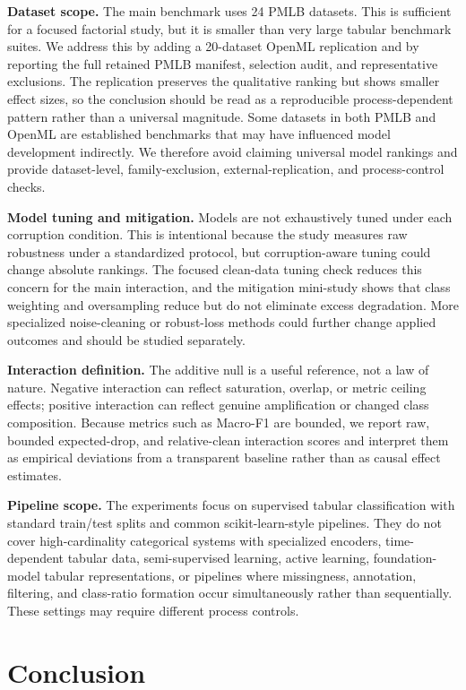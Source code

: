 \documentclass[preprint,12pt,number]{elsarticle}
\begin{document}
\textbf{Dataset scope.} The main benchmark uses 24 PMLB datasets. This is sufficient for a focused factorial study, but it is smaller than very large tabular benchmark suites. We address this by adding a 20-dataset OpenML replication and by reporting the full retained PMLB manifest, selection audit, and representative exclusions. The replication preserves the qualitative ranking but shows smaller effect sizes, so the conclusion should be read as a reproducible process-dependent pattern rather than a universal magnitude. Some datasets in both PMLB and OpenML are established benchmarks that may have influenced model development indirectly. We therefore avoid claiming universal model rankings and provide dataset-level, family-exclusion, external-replication, and process-control checks.

\textbf{Model tuning and mitigation.} Models are not exhaustively tuned under each corruption condition. This is intentional because the study measures raw robustness under a standardized protocol, but corruption-aware tuning could change absolute rankings. The focused clean-data tuning check reduces this concern for the main interaction, and the mitigation mini-study shows that class weighting and oversampling reduce but do not eliminate excess degradation. More specialized noise-cleaning or robust-loss methods could further change applied outcomes and should be studied separately.

\textbf{Interaction definition.} The additive null is a useful reference, not a law of nature. Negative interaction can reflect saturation, overlap, or metric ceiling effects; positive interaction can reflect genuine amplification or changed class composition. Because metrics such as Macro-F1 are bounded, we report raw, bounded expected-drop, and relative-clean interaction scores and interpret them as empirical deviations from a transparent baseline rather than as causal effect estimates.

\textbf{Pipeline scope.} The experiments focus on supervised tabular classification with standard train/test splits and common scikit-learn-style pipelines. They do not cover high-cardinality categorical systems with specialized encoders, time-dependent tabular data, semi-supervised learning, active learning, foundation-model tabular representations, or pipelines where missingness, annotation, filtering, and class-ratio formation occur simultaneously rather than sequentially. These settings may require different process controls.

\section{Conclusion}
\end{document}
